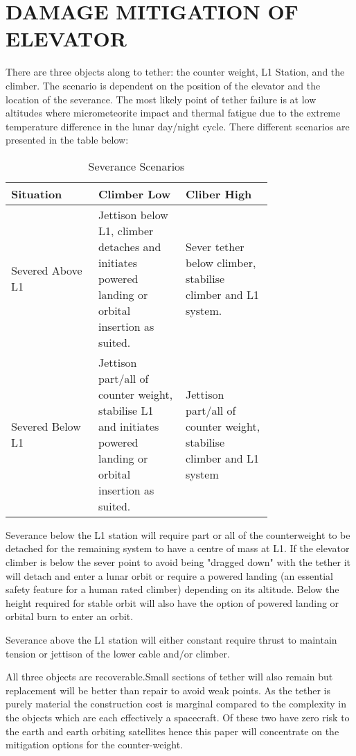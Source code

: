 \documentclass[twocolumn,prl,nobalancelastpage,aps,10pt]{revtex4-1}
\begin{document}
\section{DAMAGE MITIGATION OF ELEVATOR}

There are three objects along to tether: the counter weight, L1 Station, and the climber. The scenario is dependent on the position of the elevator and the location of the severance. The most likely point of tether failure is at low altitudes where micrometeorite impact and thermal fatigue due to the extreme temperature difference in the lunar day/night cycle. There different scenarios are presented in the table below:

\begin{table}[h!]
  \begin{center}
    \caption{Severance Scenarios}
    \label{tab:scenarios}
    \begin{tabular}{|p{0.25\linewidth}|p{0.25\linewidth}|p{0.25\linewidth}|}
      \hline
      Situation & Climber Low & Cliber High\\
      \hline
      Severed Above L1 & Jettison below L1, climber detaches and initiates powered landing or orbital insertion as suited. & Sever tether below climber, stabilise climber and L1 system.\\
      \hline
      Severed Below L1 & Jettison part/all of counter weight, stabilise L1 and initiates powered landing or orbital insertion as suited. & Jettison part/all of counter weight, stabilise climber and L1 system \\
      \hline
    \end{tabular}
  \end{center}
\end{table}

Severance below the L1 station will require part or all of the counterweight to be detached for the remaining system to have a centre of mass at L1. If the elevator climber is below the sever point to avoid being "dragged down" with the tether it will detach and enter a lunar orbit or require a powered landing (an essential safety feature for a human rated climber) depending on its altitude. Below the height required for stable orbit will also have the option of powered landing or orbital burn to enter an orbit.

Severance above the L1 station will either constant require thrust to maintain tension or jettison of the lower cable and/or climber.

All three objects are recoverable.Small sections of tether will also remain but replacement will be better than repair to avoid weak points. As the tether is purely material the construction cost is marginal compared to the complexity in the objects which are each effectively a spacecraft. Of these two have zero risk to the earth and earth orbiting satellites hence this paper will concentrate on the mitigation options for the counter-weight.
\end{document}
